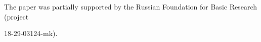 










        




        




        


        \Ack


        \noindent


The paper was partially supported by the Russian Foundation for Basic Research (project 


18-29-03124-mk).


        




        


        \renewcommand{\bibname}{\protect\rmfamily References}




        


